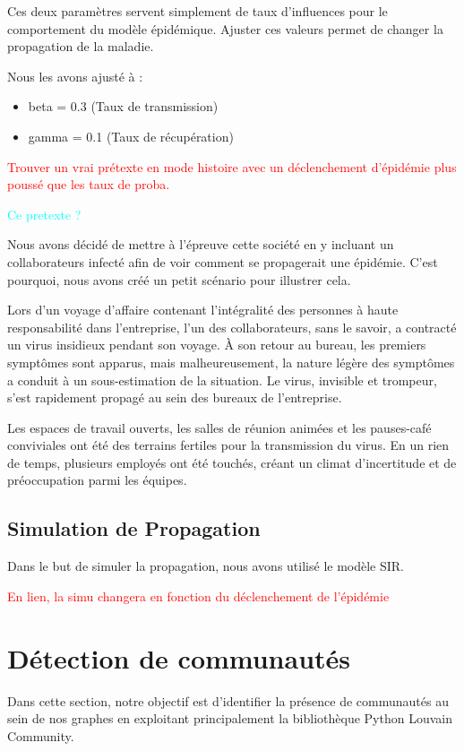 \documentclass{article}
\begin{document}
Ces deux paramètres servent simplement de taux d'influences pour le comportement du modèle épidémique. Ajuster ces valeurs permet de changer la propagation de la maladie.

Nous les avons ajusté à :
\begin{itemize}
    \item beta = 0.3 (Taux de transmission)
    \item gamma = 0.1 (Taux de récupération)
\end{itemize}


\textcolor{red}{Trouver un vrai prétexte en mode histoire avec un déclenchement d'épidémie plus poussé que les taux de proba.}

\textcolor{cyan}{Ce pretexte ?}

Nous avons décidé de mettre à l'épreuve cette société en y incluant un collaborateurs infecté afin de voir comment se propagerait une épidémie. C'est pourquoi, nous avons créé un petit scénario pour illustrer cela.

Lors d'un voyage d'affaire contenant l'intégralité des personnes à haute responsabilité dans l'entreprise, l'un des collaborateurs, sans le savoir, a contracté un virus insidieux pendant son voyage. À son retour au bureau, les premiers symptômes sont apparus, mais malheureusement, la nature légère des symptômes a conduit à un sous-estimation de la situation. Le virus, invisible et trompeur, s'est rapidement propagé au sein des bureaux de l'entreprise.

Les espaces de travail ouverts, les salles de réunion animées et les pauses-café conviviales ont été des terrains fertiles pour la transmission du virus. En un rien de temps, plusieurs employés ont été touchés, créant un climat d'incertitude et de préoccupation parmi les équipes.

\subsection{Simulation de Propagation}
Dans le but de simuler la propagation, nous avons utilisé le modèle SIR.


\textcolor{red}{En lien, la simu changera en fonction du déclenchement de l'épidémie}


\section{Détection de communautés}
Dans cette section, notre objectif est d'identifier la présence de communautés au sein de nos graphes en exploitant principalement la bibliothèque Python Louvain Community.
\end{document}
